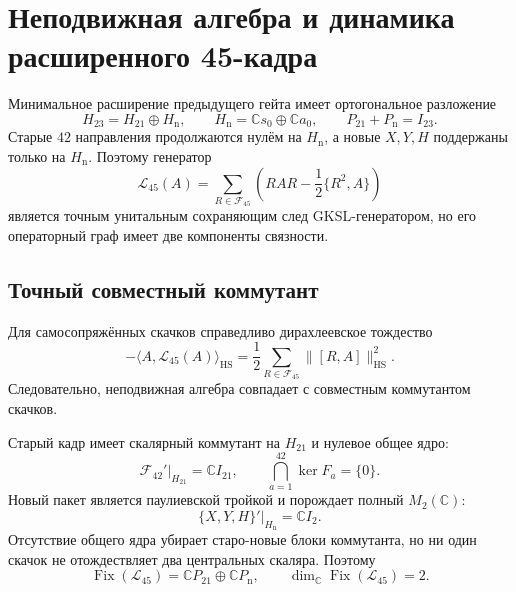 \chapter{Неподвижная алгебра и динамика расширенного 45-кадра}
\label{ch:v8-baryon-c0-extended-45-frame-fixed-algebra-and-dynamics-gate}

Минимальное расширение предыдущего гейта имеет ортогональное разложение
\begin{equation}
 H_{23}=H_{21}\oplus H_{\mathrm n},
 \qquad H_{\mathrm n}=\mathbb C s_0\oplus\mathbb C a_0,
 \qquad P_{21}+P_{\mathrm n}=I_{23}.
 \label{eq:v8-baryon-c0-h23-old-new-splitting}
\end{equation}
Старые $42$ направления продолжаются нулём на $H_{\mathrm n}$, а новые
$X,Y,H$ поддержаны только на $H_{\mathrm n}$. Поэтому генератор
\begin{equation}
 \mathcal L_{45}(A)=\sum_{R\in\mathcal F_{45}}
 \left(RAR-\frac12\{R^2,A\}\right)
 \label{eq:v8-baryon-c0-l45-gksl}
\end{equation}
является точным унитальным сохраняющим след GKSL-генератором, но его
операторный граф имеет две компоненты связности.

\section{Точный совместный коммутант}

Для самосопряжённых скачков справедливо дирахлеевское тождество
\begin{equation}
 -\langle A,\mathcal L_{45}(A)\rangle_{\mathrm{HS}}
 =\frac12\sum_{R\in\mathcal F_{45}}\lVert[R,A]\rVert_{\mathrm{HS}}^2.
 \label{eq:v8-baryon-c0-l45-dirichlet-identity}
\end{equation}
Следовательно, неподвижная алгебра совпадает с совместным коммутантом
скачков.

Старый кадр имеет скалярный коммутант на $H_{21}$ и нулевое общее ядро:
\begin{equation}
 \mathcal F_{42}'\big|_{H_{21}}=\mathbb C I_{21},
 \qquad \bigcap_{a=1}^{42}\ker F_a=\{0\}.
 \label{eq:v8-baryon-c0-old-frame-irreducible-kernel-free}
\end{equation}
Новый пакет является паулиевской тройкой и порождает полный
$M_2(\mathbb C)$:
\begin{equation}
 \{X,Y,H\}'\big|_{H_{\mathrm n}}=\mathbb C I_2.
 \label{eq:v8-baryon-c0-new-pauli-commutant}
\end{equation}
Отсутствие общего ядра убирает старо-новые блоки коммутанта, но ни один
скачок не отождествляет два центральных скаляра. Поэтому
\begin{equation}
 \operatorname{Fix}(\mathcal L_{45})
 =\mathbb C P_{21}\oplus\mathbb C P_{\mathrm n},
 \qquad \dim_{\mathbb C}\operatorname{Fix}(\mathcal L_{45})=2.
 \label{eq:v8-baryon-c0-l45-fixed-algebra-c2}
\end{equation}

